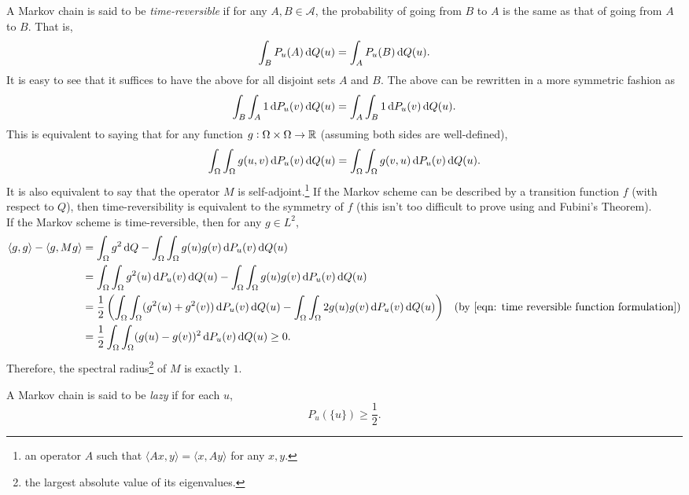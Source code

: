 A Markov chain is said to be \textit{time-reversible} if for any $A,B\in\mathcal{A}$, the probability of going from $B$ to $A$ is the same as that of going from $A$ to $B$. That is,
\[ \int_B P_u(A)\operatorname{d}\!{Q}(u) = \int_A P_u(B) \operatorname{d}\!{Q}(u). \]
It is easy to see that it suffices to have the above for all disjoint sets $A$ and $B$. The above can be rewritten in a more symmetric fashion as
\begin{equation}
	\label{eqn: 4.12}
	\int_B \int_A 1\operatorname{d}\!{P}_u(v)\operatorname{d}\!{Q}(u) = \int_A \int_B 1\operatorname{d}\!{P}_u(v)\operatorname{d}\!{Q}(u).
\end{equation}
This is equivalent to saying that for any function $g:\Omega\times\Omega\to\mathbb{R}$ (assuming both sides are well-defined),
\begin{equation}
\label{eqn: time reversible function formulation}
	\int_\Omega \int_\Omega g(u,v)\operatorname{d}\!{P}_u(v)\operatorname{d}\!{Q}(u) = \int_\Omega \int_\Omega g(v,u)\operatorname{d}\!{P}_u(v)\operatorname{d}\!{Q}(u).
\end{equation}
It is also equivalent to say that the operator $M$ is self-adjoint.\footnote{an operator $A$ such that $\langle Ax,y\rangle=\langle x,A y\rangle$ for any $x,y$.} If the Markov scheme can be described by a transition function $f$ (with respect to $Q$), then time-reversibility is equivalent to the symmetry of $f$ (this isn't too difficult to prove using  and Fubini's Theorem).\\
If the Markov scheme is time-reversible, then for any $g\in L^2$,
\begin{align}
	\langle g,g\rangle - \langle g,M g\rangle &= \int_{\Omega} g^2\d{Q} - \int_\Omega\int_\Omega g(u)g(v)\d{P_u}(v)\d{Q}(u) \nonumber \\
	&= \int_{\Omega}\int_\Omega g^2(u)\d{P_u}(v)\d{Q}(u) - \int_\Omega\int_\Omega g(u)g(v)\d{P_u}(v)\d{Q}(u) \nonumber \\
	&= \frac{1}{2} \left(\int_{\Omega}\int_\Omega (g^2(u)+g^2(v))\d{P_u}(v)\d{Q}(u) - \int_\Omega\int_\Omega 2g(u)g(v)\d{P_u}(v)\d{Q}(u)\right) & (\text{by \Cref{eqn: time reversible function formulation}}) \nonumber \\
	&= \frac{1}{2}\int_\Omega\int_\Omega (g(u)-g(v))^2\d{P_u}(v)\d{Q}(u) \geq 0. \label{eqn: self-adjoint spectral radius 1}
\end{align}
Therefore, the spectral radius\footnote{the largest absolute value of its eigenvalues.} of $M$ is exactly $1$.

\begin{definition}[Laziness]
A Markov chain is said to be \textit{lazy} if for each $u$,
\[ P_u(\{u\})\geq\frac{1}{2}. \]
\end{definition}

